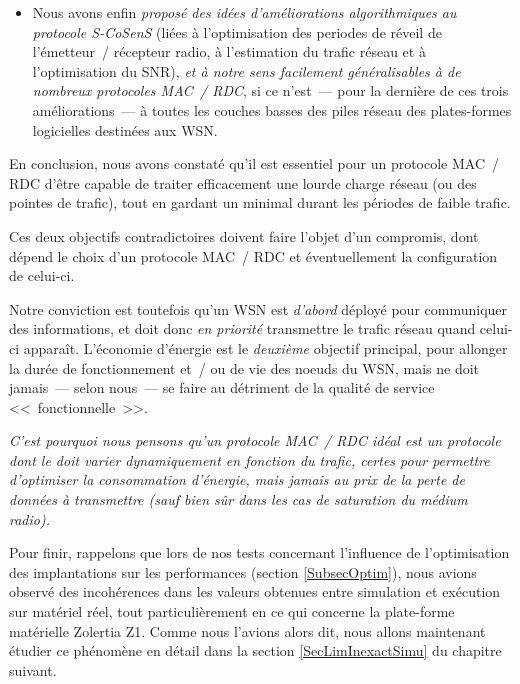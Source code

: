 \begin{itemize}
\item Nous avons enfin \emph{proposé des idées d'améliorations
algorithmiques au protocole S-CoSenS} (liées à l'optimisation des periodes
de réveil de l'émetteur~/ récepteur radio, à l'estimation du trafic réseau
et à l'optimisation du SNR), \emph{et à notre sens facilement généralisables
à de nombreux protocoles MAC~/ RDC}, si ce n'est~--- pour la dernière de
ces trois améliorations~--- à toutes les couches basses des piles réseau
des plates-formes logicielles destinées aux WSN.

\end{itemize}

En conclusion, nous avons constaté qu'il est essentiel pour un protocole
MAC~/ RDC d'être capable de traiter efficacement une lourde charge réseau
(ou des pointes de trafic), tout en gardant un  minimal
durant les périodes de faible trafic.

Ces deux objectifs contradictoires doivent faire l'objet d'un compromis,
dont dépend le choix d'un protocole MAC~/ RDC et éventuellement la
configuration de celui-ci.

Notre conviction est toutefois qu'un WSN est \emph{d'abord} déployé pour
communiquer des informations, et doit donc \emph{en priorité} transmettre
le trafic réseau quand celui-ci apparaît. L'économie d'énergie est le
\emph{deuxième} objectif principal, pour allonger la durée de fonctionnement
et~/ ou de vie des noeuds du WSN, mais ne doit jamais~--- selon nous~---
se faire au détriment de la qualité de service <<~fonctionnelle~>>.

\emph{C'est pourquoi nous pensons qu'un protocole MAC~/ RDC idéal
est un protocole dont le  doit varier dynamiquement
en fonction du trafic, certes pour permettre d'optimiser la consommation
d'énergie, mais jamais au prix de la perte de données à transmettre
(sauf bien sûr dans les cas de saturation du médium radio).}

\bigskip

Pour finir, rappelons que lors de nos tests concernant l'influence
de l'optimisation des implantations sur les performances (section
\vref{SubsecOptim}), nous avions observé des incohérences dans les
valeurs obtenues entre simulation et exécution sur matériel réel, tout
particulièrement en ce qui concerne la plate-forme matérielle Zolertia Z1.
Comme nous l'avions alors dit, nous allons maintenant étudier ce phénomène
en détail dans la section \ref{SecLimInexactSimu} du chapitre suivant.



